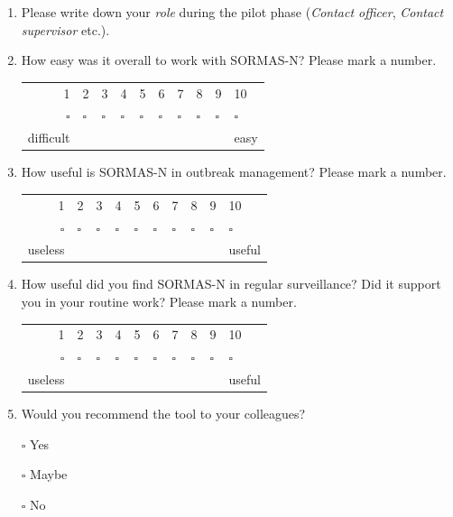\documentclass[a4paper, titlepage]{tufte-handout}
\begin{document}
\begin{enumerate}
\item Please write down your \emph{role} during the pilot phase (\emph{Contact officer}, \emph{Contact supervisor} etc.).

\hrulefill

\item How easy was it overall to work with SORMAS-N? Please mark a number.

\begin{tabular}{rlllllllll}
1 & 2 & 3 & 4 & 5 & 6 & 7 & 8 & 9 & 10\\
$\square$ & $\square$ & $\square$ & $\square$ & $\square$ & $\square$ & $\square$ & $\square$ & $\square$ & $\square$\\
difficult &  &  &  &  &  &  &  &  & easy\\
\end{tabular}
\medskip

\item How useful is SORMAS-N in outbreak management? Please mark a number.

\begin{tabular}{rlllllllll}
1 & 2 & 3 & 4 & 5 & 6 & 7 & 8 & 9 & 10\\
$\square$ & $\square$ & $\square$ & $\square$ & $\square$ & $\square$ & $\square$ & $\square$ & $\square$ & $\square$\\
\enspace useless &  &  &  &  &  &  &  &  & useful\\
\end{tabular}
\medskip

\item How useful did you find SORMAS-N in regular surveillance? Did it support you in your routine work? Please mark a number.

\begin{tabular}{rlllllllll}
1 & 2 & 3 & 4 & 5 & 6 & 7 & 8 & 9 & 10\\
$\square$ & $\square$ & $\square$ & $\square$ & $\square$ & $\square$ & $\square$ & $\square$ & $\square$ & $\square$\\
\enspace useless &  &  &  &  &  &  &  &  & useful\\
\end{tabular}
\medskip

\item Would you recommend the tool to your colleagues?

\quad $\square$ Yes

\quad $\square$ Maybe

\quad $\square$ No


\end{enumerate}
\end{document}
